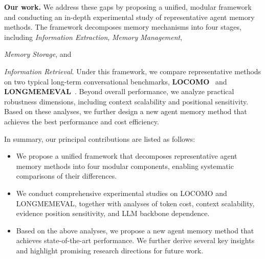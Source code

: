\textbf{Our work.} We address these gaps by proposing a unified, modular framework and conducting an in-depth experimental study of representative agent memory methods. 
The framework decomposes memory mechanisms into four stages, including {\Large {}} {\textit{Information Extraction}},  {\Large {}} {\textit{Memory Management}}, {{{\Large {}}} {\it Memory Storage}, and {{{\Large {}}} {\it Information Retrieval}. Under this framework, we compare representative methods on two typical long-term conversational benchmarks, \textbf{LOCOMO}~\cite{maharana2024locomo} and \textbf{LONGMEMEVAL}~\cite{wu2025longmemeval}. Beyond overall performance, we analyze practical robustness dimensions, including context scalability and positional sensitivity. Based on these analyses, we further design a new agent memory method that achieves the best performance and cost efficiency.


In summary, our principal contributions are listed as follows:
\begin{itemize}[topsep=1mm, partopsep=0pt, itemsep=0pt, leftmargin=10pt]
    \item We propose a unified framework that decomposes representative agent memory methods into four modular components, enabling systematic comparisons of their differences.
    \item We conduct comprehensive experimental studies on LOCOMO and LONGMEMEVAL, together with analyses of token cost, context scalability, evidence position sensitivity, and LLM backbone dependence.
    \item Based on the above analyses, we propose a new agent memory method that achieves state-of-the-art performance. We further derive several key insights and highlight promising research directions for future work.
\end{itemize}

}}
